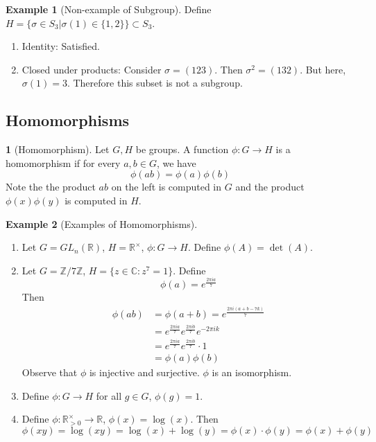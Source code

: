\documentclass[12pt]{article}
\theoremstyle{definition}
\newtheorem{definition}{\color{NavyBlue}{\textbf{Definition}}}
\newcommand{\R}{\mathbb{R}}
\newtheorem{example}{\color{WildStrawberry}Example}
\theoremstyle{definition}
\begin{document}
\begin{example}[Non-example of Subgroup]
Define $H = \{ \sigma \in S_3 | \sigma(1) \in \{1, 2 \} \} \subset S_3$. 
\begin{enumerate}
	\item Identity: Satisfied.
	\item Closed under products: Consider $\sigma = (1 2 3)$. Then $\sigma^2 = (1 3 2)$. But here, $\sigma(1) = 3$. Therefore this subset is not a subgroup.
\end{enumerate}	
\end{example}

\subsection{Homomorphisms}
\begin{definition}[Homomorphism]
	Let $G, H$ be groups. A function $\phi : G \to H$ is a homomorphism if for every $a,b \in G$, we have 
	\begin{equation}
		\phi(ab) = \phi(a)\phi(b)
	\end{equation}
	Note the the product $ab$ on the left is computed in $G$ and the product $\phi(x)\phi(y)$ is computed in $H$.
\end{definition}

\begin{example}[Examples of Homomorphisms]
\begin{enumerate}
	\item Let $G = GL_n(\mathbb{R})$, $H = \mathbb{R}^{\times}$, $\phi : G \to H$. Define $\phi(A) = \det(A)$.
	\item Let $G = \mathbb{Z} / 7 \mathbb{Z}$, $H = \{z \in \mathbb{C}: z^7 = 1\}$. Define
	\begin{equation}
		\phi(a) = e^{\frac{2\pi i a}{7}}
	\end{equation}
	Then
	\begin{align*}
		\phi(ab) &= \phi(a + b) = e^{\frac{2\pi i (a + b - 7k)}{7}} \\
		&= e^{\frac{2\pi i a}{7}} e^{\frac{2\pi i b}{7}} e^{-2\pi i k}  \\
		&= e^{\frac{2\pi i a}{7}} e^{\frac{2\pi i b}{7}} \cdot 1 \\
		&= \phi(a)\phi(b)
	\end{align*}
	Observe that $\phi$ is injective and surjective. $\phi$ is an isomorphism.
	\item Define $\phi : G \to H$ for all $g \in G$, $\phi(g) = 1$.
	\item Define $\phi : \R^{\times}_{> 0} \to \R$, $\phi(x) = \log(x)$. Then
	\begin{equation}
		\phi(xy) = \log(xy) = \log(x) + \log(y) = \phi(x) \cdot \phi(y) = \phi(x) + \phi(y)
	\end{equation}
\end{enumerate}
\end{example}
\end{document}
